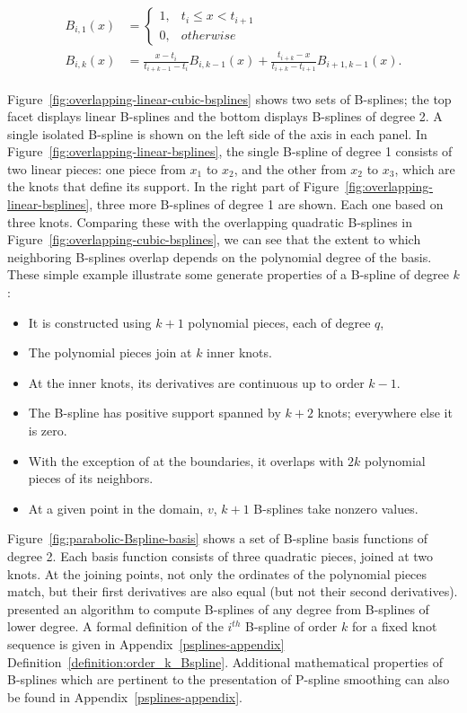 \begin{align} 
\begin{split} \label{eq:bspline-recursive-relation}
B_{i,1}\left(x\right) &= \left\{ \begin{array}{ll}
1, & t_i \le x < t_{i+1}\\
0, & otherwise
\end{array} \right.
\\
B_{i,k}\left(x\right) &= \frac{x-t_i}{t_{i+k-1}-t_i}B_{i,k-1}\left(x\right) + \frac{t_{i+k}-x}{t_{i+k}-t_{i+1}}B_{i+1,k-1}\left(x\right). 
\end{split}
\end{align}

Figure~\ref{fig:overlapping-linear-cubic-bsplines} shows two sets of B-splines; the top facet displays linear B-splines and the bottom displays B-splines of degree 2. A single isolated B-spline is shown on the left side of the axis in each panel. In Figure~\ref{fig:overlapping-linear-bsplines}, the single B-spline of degree 1 consists of two linear pieces: one piece from $x_1$ to $x_2$, and the other from $x_2$ to $x_3$, which are the knots that define its support. In the right part of Figure~\ref{fig:overlapping-linear-bsplines}, three more B-splines of degree 1 are shown. Each one based on three knots. Comparing these with the overlapping quadratic B-splines in Figure~\ref{fig:overlapping-cubic-bsplines}, we can see that the extent to which neighboring B-splines overlap depends on the polynomial degree of the basis. These simple example illustrate some generate properties of a B-spline of degree $k$:

\begin{itemize}
\item It is constructed using $k + 1$ polynomial pieces, each of degree $q$,
\item The polynomial pieces join at $k$ inner knots.
\item At the inner knots, its derivatives are continuous up to order $k-1$.
\item The B-spline has positive support spanned by $k + 2$ knots; everywhere else it is zero.
\item With the exception of at the boundaries, it overlaps with $2k$ polynomial pieces of its neighbors.
\item At a given point in the domain, $v$, $k + 1$ B-splines take nonzero values.
\end{itemize}

Figure~\ref{fig:parabolic-Bspline-basis} shows a set of B-spline basis functions of degree 2. Each basis function consists of three quadratic pieces, joined at two knots. At the joining points, not only the ordinates of the polynomial pieces match, but their first derivatives are also equal (but not their second derivatives).  \cite{de1978practical} presented an algorithm to compute B-splines of any degree from B-splines of lower degree.  A formal definition of the $i^{th}$ B-spline of order $k$ for a fixed knot sequence is given in Appendix~\ref{psplines-appendix} Definition~\ref{definition:order_k_Bspline}. Additional mathematical properties of B-splines which are pertinent to the presentation of P-spline smoothing can also be found in Appendix~\ref{psplines-appendix}.


